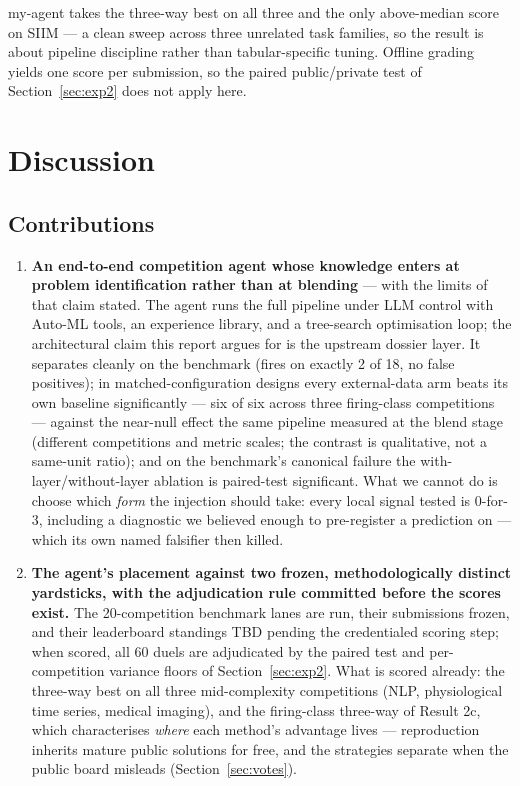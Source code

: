 \documentclass[11pt,a4paper]{article}
\begin{document}
my-agent takes the three-way best on all three and the only above-median score on SIIM --- a clean sweep across three unrelated task families, so the result is about pipeline discipline rather than tabular-specific tuning. Offline grading yields one score per submission, so the paired public/private test of Section~\ref{sec:exp2} does not apply here.

\section{Discussion}

\subsection{Contributions}

\begin{enumerate}[leftmargin=*]
  \item \textbf{An end-to-end competition agent whose knowledge enters at problem
  identification rather than at blending} --- with the limits of that claim stated. The agent
  runs the full pipeline under LLM control with Auto-ML tools, an experience library, and a
  tree-search optimisation loop; the architectural claim this report argues for is the
  upstream dossier layer. It separates cleanly on the benchmark (fires on exactly 2 of 18, no
  false positives); in matched-configuration designs every external-data arm beats its own
  baseline significantly --- six of six across three firing-class competitions --- against the
  near-null effect the same pipeline measured at the blend stage (different competitions and
  metric scales; the contrast is qualitative, not a same-unit ratio); and on the benchmark's
  canonical failure the with-layer/without-layer ablation is paired-test significant. What we
  cannot do is choose which \emph{form} the injection should take: every local signal tested is
  0-for-3, including a diagnostic we believed enough to pre-register a prediction on --- which
  its own named falsifier then killed.

  \item \textbf{The agent's placement against two frozen, methodologically distinct
  yardsticks, with the adjudication rule committed before the scores exist.} The 20-competition
  benchmark lanes are run, their submissions frozen, and their leaderboard standings TBD
  pending the credentialed scoring step; when scored, all 60 duels are adjudicated by the
  paired test and per-competition variance floors of Section~\ref{sec:exp2}. What is scored
  already: the three-way best on all three mid-complexity competitions (NLP, physiological
  time series, medical imaging), and the firing-class three-way of Result 2c, which
  characterises \emph{where} each method's advantage lives --- reproduction inherits mature
  public solutions for free, and the strategies separate when the public board misleads
  (Section~\ref{sec:votes}).


\end{enumerate}
\end{document}
